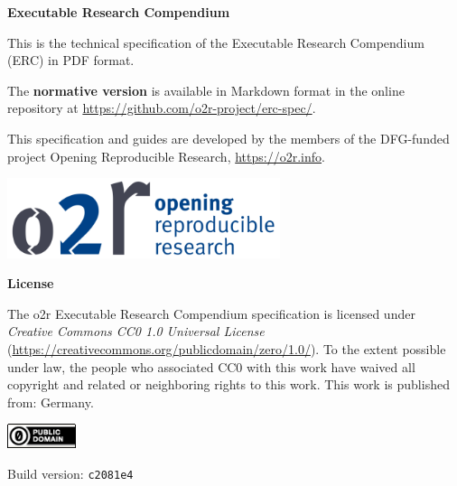 \begin{titlepage}
    {\raggedleft
        \textbf{\Large Executable Research Compendium}\\
    }
    \vspace{\fill}
	
    This is the technical specification of the Executable Research Compendium (ERC) in PDF format.

    The \textbf{normative version} is available in Markdown format in the online repository at \url{https://github.com/o2r-project/erc-spec/}.

    This specification and guides are developed by the members of the DFG-funded project Opening Reproducible Research, \url{https://o2r.info}.

    \vspace{1cm}
    \begin{center}
        \includegraphics[width=8cm]{docs/o2r-logo}
    \end{center}
    \vspace{3cm}

    \textbf{License}

    The o2r Executable Research Compendium specification is licensed under \emph{Creative Commons CC0 1.0 Universal License} (\url{https://creativecommons.org/publicdomain/zero/1.0/}).
    To the extent possible under law, the people who associated CC0 with this work have waived all copyright and related or neighboring rights to this work.
    This work is published from: Germany.

    \includegraphics[width=2cm]{docs/cc-zero}

    Build version: \texttt{c2081e4}
 
\end{titlepage}
